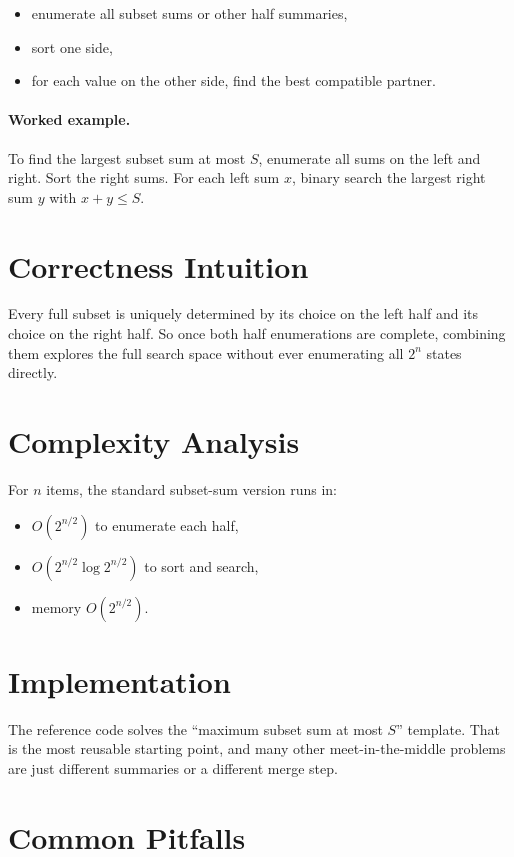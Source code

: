 \begin{itemize}
  \item enumerate all subset sums or other half summaries,
  \item sort one side,
  \item for each value on the other side, find the best compatible partner.
\end{itemize}

\paragraph{Worked example.}
To find the largest subset sum at most \(S\), enumerate all sums on the left and right. Sort the right sums. For each
left sum \(x\), binary search the largest right sum \(y\) with \(x + y \le S\).

\section*{Correctness Intuition}

Every full subset is uniquely determined by its choice on the left half and its choice on the right half. So once both
half enumerations are complete, combining them explores the full search space without ever enumerating all \(2^n\)
states directly.

\section*{Complexity Analysis}

For \(n\) items, the standard subset-sum version runs in:
\begin{itemize}
  \item \(O(2^{n/2})\) to enumerate each half,
  \item \(O(2^{n/2} \log 2^{n/2})\) to sort and search,
  \item memory \(O(2^{n/2})\).
\end{itemize}

\section*{Implementation}

The reference code solves the ``maximum subset sum at most \(S\)'' template. That is the most reusable starting point,
and many other meet-in-the-middle problems are just different summaries or a different merge step.

\section*{Common Pitfalls}

